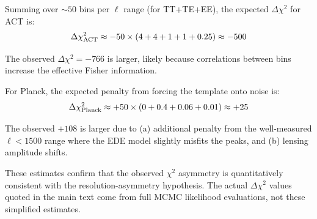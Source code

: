 \documentclass[twocolumn,showpacs,preprintnumbers,amsmath,amssymb,prd]{revtex4-2}
\begin{document}
Summing over $\sim 50$ bins per $\ell$ range (for TT+TE+EE), the expected 
$\Delta\chi^2$ for ACT is:
\begin{equation}
\Delta\chi^2_{\rm ACT} \approx -50 \times (4 + 4 + 1 + 1 + 0.25) \approx -500
\end{equation}

The observed $\Delta\chi^2 = -766$ is larger, likely because correlations 
between bins increase the effective Fisher information.

For Planck, the expected penalty from forcing the template onto noise is:
\begin{equation}
\Delta\chi^2_{\rm Planck} \approx +50 \times (0 + 0.4 + 0.06 + 0.01) \approx +25
\end{equation}

The observed $+108$ is larger due to (a) additional penalty from the 
well-measured $\ell < 1500$ range where the EDE model slightly misfits 
the peaks, and (b) lensing amplitude shifts.

These estimates confirm that the observed $\chi^2$ asymmetry is quantitatively 
consistent with the resolution-asymmetry hypothesis. The actual $\Delta\chi^2$ 
values quoted in the main text come from full MCMC likelihood evaluations, 
not these simplified estimates.
\end{document}

